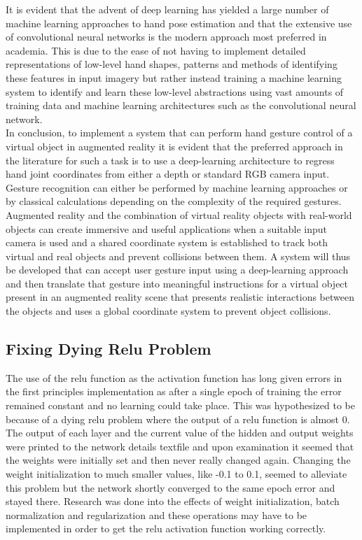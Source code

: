 It is evident that the advent of deep learning has yielded a large number of machine learning approaches to hand pose estimation and that the extensive use of convolutional neural networks is the modern approach most preferred in academia. This is due to the ease of not having to implement detailed representations of low-level hand shapes, patterns and methods of identifying these features in input imagery but rather instead training a machine learning system to identify and learn these low-level abstractions using vast amounts of training data and machine learning architectures such as the convolutional neural network. \\

In conclusion, to implement a system that can perform hand gesture control of a virtual object in augmented reality it is evident that the preferred approach in the literature for such a task is to use a deep-learning architecture to regress hand joint coordinates from either a depth or standard RGB camera input. Gesture recognition can either be performed by machine learning approaches or by classical calculations depending on the complexity of the required gestures. Augmented reality and the combination of virtual reality objects with real-world objects can create immersive and useful applications when a suitable input camera is used and a shared coordinate system is established to track both virtual and real objects and prevent collisions between them. A system will thus be developed that can accept user gesture input using a deep-learning approach and then translate that gesture into meaningful instructions for a virtual object present in an augmented reality scene that presents realistic interactions between the objects and uses a global coordinate system to prevent object collisions. \\

\subsection{Fixing Dying Relu Problem}
The use of the relu function as the activation function has long given errors in the first principles implementation as after a single epoch of training the error remained constant and no learning could take place. This was hypothesized to be because of a dying relu problem where the output of a relu function is almost 0. The output of each layer and the current value of the hidden and output weights were printed to the network details textfile and upon examination it seemed that the weights were initially set and then never really changed again. Changing the weight initialization to much smaller values, like -0.1 to 0.1, seemed to alleviate this problem but the network shortly converged to the same epoch error and stayed there. Research was done into the effects of weight initialization, batch normalization and regularization and these operations may have to be implemented in order to get the relu activation function working correctly. \\

